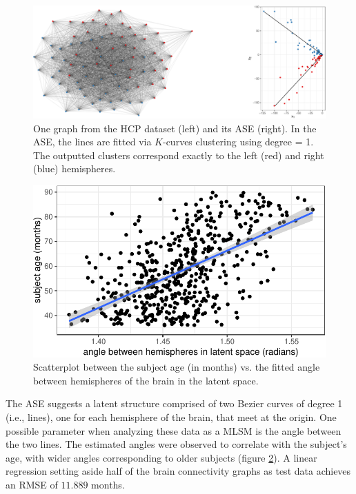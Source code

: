 \documentclass[12pt]{article}
\begin{document}
\begin{figure}[H]

{\centering \includegraphics[width=1\linewidth]{draft_files/figure-latex/hcp-ase-1} 

}

\caption{One graph from the HCP dataset (left) and its ASE (right). In the ASE, the lines are fitted via $K$-curves clustering using degree = 1. The outputted clusters correspond exactly to the left (red) and right (blue) hemispheres.}\label{fig:hcp-ase}
\end{figure}

\begin{figure}[H]

{\centering \includegraphics{draft_files/figure-latex/hcp-age-regression-1} 

}

\caption{Scatterplot between the subject age (in months) vs. the fitted angle between hemispheres of the brain in the latent space.}\label{fig:hcp-age-regression}
\end{figure}

The ASE suggests a latent structure comprised of two Bezier curves of
degree 1 (i.e., lines), one for each hemisphere of the brain, that meet
at the origin. One possible parameter when analyzing these data as a
MLSM is the angle between the two lines. The estimated angles were
observed to correlate with the subject's age, with wider angles
corresponding to older subjects (figure \ref{fig:hcp-age-regression}). A
linear regression setting aside half of the brain connectivity graphs as
test data achieves an RMSE of \(11.889\) months.
\end{document}
